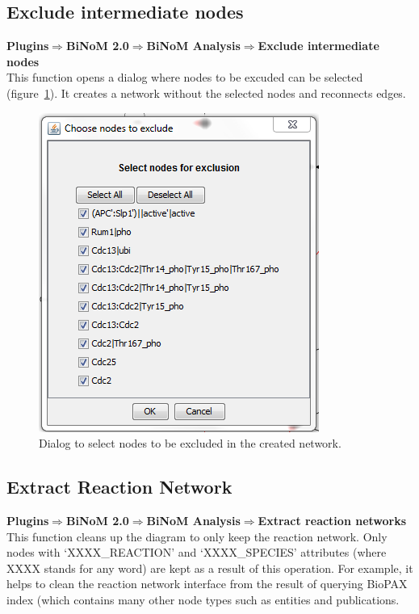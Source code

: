 \subsection{Exclude intermediate nodes}
\textbf{Plugins$\Rightarrow$BiNoM 2.0$\Rightarrow$BiNoM Analysis$\Rightarrow$Exclude intermediate nodes}\\
This function opens a dialog where nodes to be excuded can be selected (figure~\ref{Exclude_nodes_Dialog}). It creates a network without the selected nodes and reconnects edges.
\begin{figure}
\centering
\includegraphics[width=7 cm]{graphics/Exclude_nodes_Dialog}
\caption{Dialog to select nodes to be excluded in the created network.}
\label{Exclude_nodes_Dialog}
\end{figure}

\subsection{Extract Reaction Network}
\textbf{Plugins$\Rightarrow$BiNoM 2.0$\Rightarrow$BiNoM Analysis$\Rightarrow$Extract reaction networks}\\
This function cleans up the diagram to only keep the reaction network. Only nodes with ‘XXXX\_REACTION’ and ‘XXXX\_SPECIES’ attributes (where XXXX stands for any word) are kept as a result of this operation. For example, it helps to clean the reaction network interface from the result of querying BioPAX index (which contains many other node types such as entities and publications.

